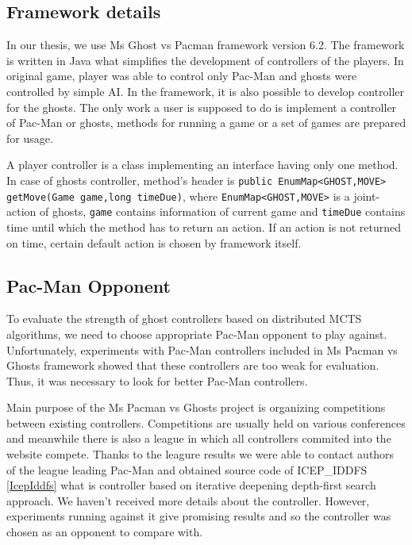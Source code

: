 \subsection{Framework details}

In our thesis, we use Ms Ghost vs Pacman framework version 6.2. The framework is written in
Java what simplifies the development of controllers of the players. In original game, player
was able to control only Pac-Man and ghosts were controlled by simple AI. In the framework,
it is also possible to develop controller for the ghosts. The only work a user is supposed to 
do is
implement a controller of Pac-Man or ghosts, methods for running a game or a set of games are
prepared for usage. 

A player controller is a class implementing an interface having only one
method. In case of ghosts controller, method's header is \texttt{public EnumMap<GHOST,MOVE>
getMove(Game game,long timeDue)}, where \texttt{EnumMap<GHOST,MOVE>} is a joint-action of
ghosts, \texttt{game} contains information of current game and \texttt{timeDue} contains time
until which the method has to return an action.
If an action is not returned on time, certain
default action is chosen by framework itself.


\subsection{Pac-Man Opponent}

To evaluate the strength of ghost controllers based on distributed MCTS algorithms, we need to
choose appropriate Pac-Man opponent to play against. Unfortunately, experiments with Pac-Man
controllers included in Ms Pacman vs Ghosts framework showed that these controllers are too
weak for evaluation. Thus, it was necessary to look for better Pac-Man controllers. 

Main purpose of the Ms Pacman vs Ghosts project is organizing competitions between existing
controllers. Competitions are usually held on various conferences and meanwhile there is also a
league  in which all controllers commited into the website compete. Thanks to the leagure
results we were able to contact authors of the league leading Pac-Man and obtained source code
of ICEP\_IDDFS \ref{IcepIddfs} what is controller based on iterative deepening depth-first
search approach. We haven't received more details about the controller. However, experiments
running against it give promising results and so the controller was chosen as an opponent to
compare with.


